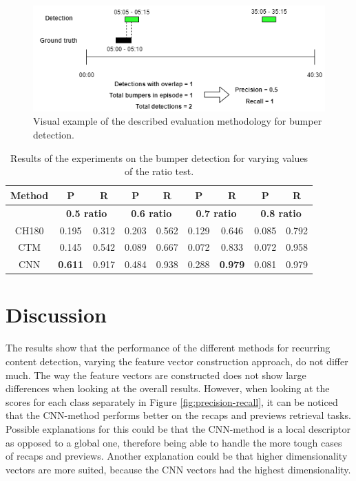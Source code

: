 \documentclass{report}
\begin{document}
\begin{figure}[H]
	\includegraphics[width=\textwidth]{images/evaluation-bumpers.png}
	\centering
	\caption{Visual example of the described evaluation methodology for bumper detection.}
	\label{fig:evaluation-example-bumpers}
\end{figure}

\begin{table}[H]
	\begin{center}
		\begin{tabular}{ c c c c c c c c c} 
			\hline
			\textbf{Method} & \textbf{P} & \textbf{R} & \textbf{P} & \textbf{R} & \textbf{P} & \textbf{R} & \textbf{P} & \textbf{R} \\
			\hline
			& \multicolumn{2}{c}{\textbf{0.5 ratio}} & \multicolumn{2}{c}{\textbf{0.6 ratio}} & \multicolumn{2}{c}{\textbf{0.7 ratio}} & \multicolumn{2}{c}{\textbf{0.8 ratio}} \\
			\hline
			CH180 			& 0.195				& 0.312 		& 0.203		& 0.562		& 0.129		& 0.646 	& 0.085 	& 0.792 \\
			CTM 			&  0.145			& 0.542 		& 0.089		& 0.667 	& 0.072		& 0.833 	& 0.072 	& 0.958 \\
			CNN 			& \textbf{0.611}	& 0.917			& 0.484		& 0.938 	& 0.288		& \textbf{0.979} 	& 0.081 	& 0.979 \\
			\hline
		\end{tabular}
	\end{center}
	\caption{Results of the experiments on the bumper detection for varying values of the ratio test.}
	\label{table:resultsbumpers}
\end{table}

\section{Discussion} \label{discussion}
The results show that the performance of the different methods for recurring content detection, varying the feature vector construction approach, do not differ much. The way the feature vectors are constructed does not show large differences when looking at the overall results. However, when looking at the scores for each class separately in Figure \ref{fig:precision-recall}, it can be noticed that the CNN-method performs better on the recaps and previews retrieval tasks. Possible explanations for this could be that the CNN-method is a local descriptor as opposed to a global one, therefore being able to handle the more tough cases of recaps and previews. Another explanation could be that higher dimensionality vectors are more suited, because the CNN vectors had the highest dimensionality.
\end{document}
